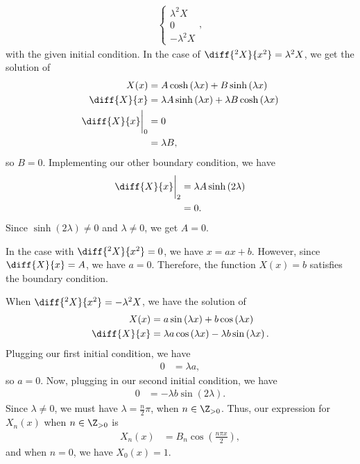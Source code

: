 \documentclass[10pt]{mypackage}
\begin{document}
\begin{example}
\begin{align*}
\begin{cases}
      \lambda^2 X\\ 0 \\ -\lambda^2 X
    \end{cases},
  \end{align*}
  with the given initial condition. In the case of $\diff{^2X}{x^2} = \lambda^2 X$, we get the solution of
  \begin{align*}
    X(x) &= A\cosh\left( \lambda x \right) + B\sinh\left( \lambda x \right)\\
    \diff{X}{x} &= \lambda A \sinh\left( \lambda x \right) + \lambda B\cosh\left( \lambda x \right)\\
    \diff{X}{x}\biggr\vert_{0} &= 0\\
                               &= \lambda B,
  \end{align*}
  so $B = 0$. Implementing our other boundary condition, we have
  \begin{align*}
    \diff{X}{x}\biggr\vert_{2} &= \lambda A \sinh\left( 2\lambda \right)\\
                               &= 0.
  \end{align*}
  Since $\sinh(2\lambda)\neq 0$ and $\lambda\neq 0$, we get $A = 0$.\newline

  In the case with $\diff{^2X}{x^2} = 0$, we have $x = ax + b$. However, since $\diff{X}{x} = A$, we have $a = 0$. Therefore, the function $X(x) = b$ satisfies the boundary condition.\newline

  When $\diff{^2 X}{x^2} = -\lambda^2 X$, we have the solution of
  \begin{align*}
    X(x) &= a\sin\left( \lambda x \right) + b\cos\left( \lambda x \right)\\
    \diff{X}{x} &= \lambda a\cos\left( \lambda x \right) - \lambda b \sin\left( \lambda x \right).
  \end{align*}
  Plugging our first initial condition, we have
  \begin{align*}
    0 &= \lambda a,
  \end{align*}
  so $a = 0$. Now, plugging in our second initial condition, we have
  \begin{align*}
    0 &= -\lambda b \sin\left( 2\lambda \right).
  \end{align*}
  Since $\lambda\neq 0$, we must have $\lambda = \frac{n}{2}\pi$, when $n\in \Z_{>0}$. Thus, our expression for $X_n(x)$ when $n\in \Z_{> 0}$ is
  \begin{align*}
    X_n(x) &= B_n\cos\left( \frac{n\pi x}{2} \right),
  \end{align*}
  and when $n = 0$, we have $X_0(x) = 1$.\newline


\end{example}
\end{document}
